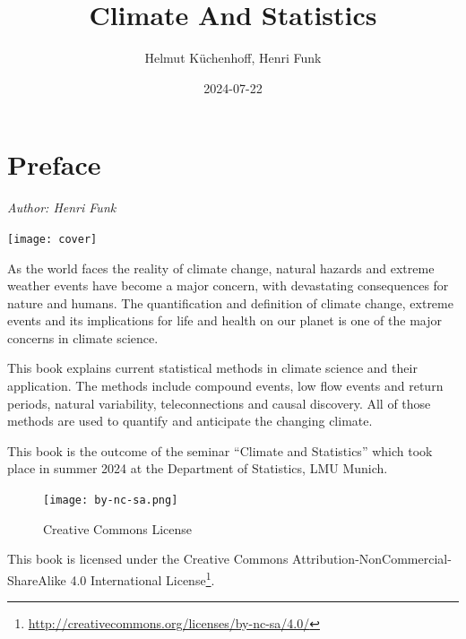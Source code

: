 \documentclass[
]{krantz}
\title{Climate And Statistics}
\author{Helmut Küchenhoff, Henri Funk}
\date{2024-07-22}
\renewcommand{\href}[2]{#2\footnote{\url{#1}}}
\begin{document}
\maketitle


\thispagestyle{empty}

\begin{center}
\end{center}

\setlength{\abovedisplayskip}{-5pt}
\setlength{\abovedisplayshortskip}{-5pt}

{
\hypersetup{linkcolor=}
\setcounter{tocdepth}{0}
\tableofcontents
}
\chapter*{Preface}\label{preface}


\emph{Author: Henri Funk}

\begin{center}\texttt{[image: cover]} \end{center}

As the world faces the reality of climate change, natural hazards and extreme weather events have become a major concern, with devastating consequences for nature and humans. The quantification and definition of climate change, extreme events and its implications for life and health on our planet is one of the major concerns in climate science.

This book explains current statistical methods in climate science and their application.
The methods include compound events, low flow events and return periods, natural variability, teleconnections and causal discovery.
All of those methods are used to quantify and anticipate the changing climate.

This book is the outcome of the seminar ``Climate and Statistics'' which took place in summer 2024 at the Department of Statistics, LMU Munich.

\begin{figure}
\centering
\texttt{[image: by-nc-sa.png]}
\caption{Creative Commons License}
\end{figure}

This book is licensed under the \href{http://creativecommons.org/licenses/by-nc-sa/4.0/}{Creative Commons Attribution-NonCommercial-ShareAlike 4.0 International License}.
\end{document}
